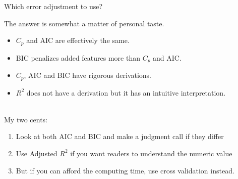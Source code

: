 \documentclass[mathserif, aspectratio=169]{beamer}
\begin{document}
\begin{frame}{Which error adjustment to use?}

The answer is somewhat a matter of personal taste.

\begin{itemize}
\item $C_p$ and AIC are effectively the same.

\item BIC penalizes added features more than $C_p$ and AIC.

\item $C_p$, AIC and BIC have rigorous derivations.

\item $R^2$ does not have a derivation but it has an intuitive interpretation.\\~\\
\end{itemize}

My two cents:
\begin{enumerate}
\item Look at both AIC and BIC and make a judgment call if they differ
\item Use Adjusted $R^2$ if you want readers to understand the numeric value
\item But if you can afford the computing time, use cross validation instead.
\end{enumerate}
\end{frame}
\end{document}
